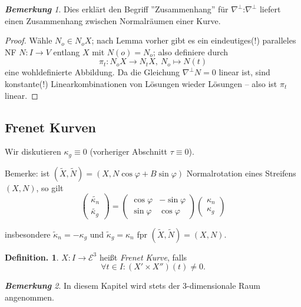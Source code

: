 \documentclass[a4paper,oneside,11pt,DIV=12,parskip=half]{scrartcl}
\newcommand{\E}{\mathcal E}
\theoremstyle{plain}
\theoremstyle{definition}
\newtheorem{definition}[theorem]{Definition.}
\newtheorem{remark, definition}[theorem]{Bemerkung und Definition.}
\newtheorem{lemma, definition}[theorem]{Lemma und Definition.}
\theoremstyle{remark}
\newtheorem*{remark}{\textbf{Bemerkung}}
\newtheorem*{remark, example}{\textbf{Bemerkung und Beispiel}}
\begin{document}
\begin{remark}
	Dies erklärt den Begriff ''Zusammenhang'' für $\nabla^\perp$:$\nabla^\perp$ liefert einen Zusammenhang zwischen Normalräumen einer Kurve.
\end{remark}

\begin{proof}
	Wähle $N_o \in N_oX$; nach Lemma vorher gibt es ein eindeutiges(!) paralleles NF $N : I \rightarrow V$ entlang $X$ mit $N(o) = N_o$; also definiere durch 
	\[\pi_t: N_oX \rightarrow N_t X,~ N_o \mapsto N(t)  \] eine wohldefinierte Abbildung. Da die Gleichung $\nabla^\perp N = 0$ linear ist, sind konstante(!) Linearkombinationen von Lösungen wieder Lösungen -- also ist $\pi_t$ linear.
\end{proof}

\subsection{Frenet Kurven}

Wir diskutieren $\kappa_g \equiv 0$ (vorheriger Abschnitt $\tau \equiv 0$).

Bemerke: ist $(\widetilde{X},\widetilde{N}) =(X,N \cos \varphi + B \sin \varphi )$ Normalrotation eines Streifens $(X,N)$, so gilt 
\begin{equation*}
\begin{pmatrix} 
\widetilde{\kappa_n}\\
\widetilde{\kappa_g}
\end{pmatrix}
=
\begin{pmatrix} 
\cos \varphi & - \sin \varphi \\
\sin \varphi & \cos \varphi
\end{pmatrix}
\begin{pmatrix}
\kappa_n\\
\kappa_g
\end{pmatrix}
\end{equation*}

insbesondere $\widetilde{\kappa}_n = - \kappa_g $ und  $\widetilde{\kappa}_g = \kappa_n$
fpr $(\widetilde{X}, \widetilde{N}) = (X,N)$.

\begin{definition}
	$X: I \rightarrow \E^3$ heißt \emph{Frenet Kurve}, falls \[ \forall t \in I: (X' \times X'')(t) \not = 0. \]
\end{definition}

\begin{remark}
	In diesem Kapitel wird stets der 3-dimensionale Raum angenommen.
\end{remark}
\end{document}

